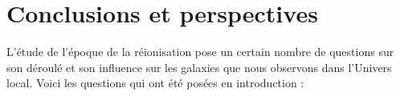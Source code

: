 
\chapter{Conclusions et perspectives}


L'étude de l'époque de la réionisation pose un certain nombre de questions sur son déroulé et son influence sur les galaxies que nous observons dans l'Univers local.
Voici les questions qui ont été posées en introduction :
%
%
%
%
%
%
%
%
%
%

